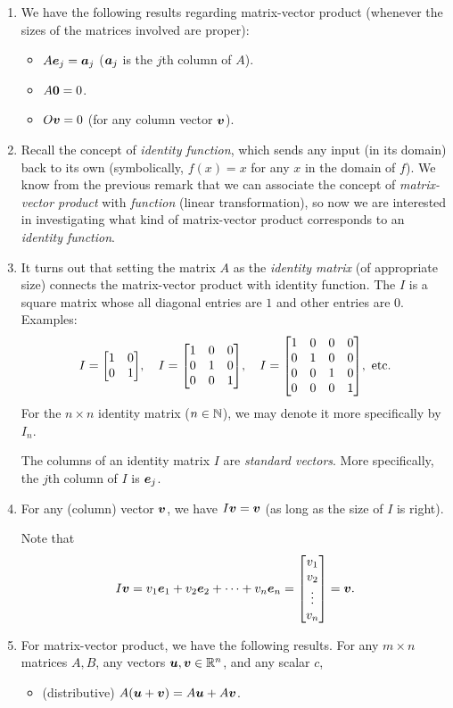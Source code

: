 \begin{enumerate}
\item We have the following results regarding matrix-vector product (whenever
the sizes of the matrices involved are proper):
\begin{itemize}
\item \(A\vb*{e}_{j}=\vb*{a}_{j}\) (\(\vb*{a}_{j}\) is the \(j\)th column of \(A\)).
\item \(A\vb*{0}=0\).
\item \(O\vb*{v}=0\) (for any column vector \(\vb*{v}\)).
\end{itemize}

\item Recall the concept of \emph{identity function}, which sends any input (in
its domain) back to its own (symbolically, \(f(x)=x\) for any \(x\) in the
domain of \(f\)). We know from the previous remark that we can associate the
concept of \emph{matrix-vector product} with \emph{function} (linear
transformation), so now we are interested in investigating what kind of
matrix-vector product corresponds to an \emph{identity function}.

\item It turns out that setting the matrix \(A\) as the \emph{identity matrix}
(of appropriate size) connects the matrix-vector product with identity
function. The  \(I\) is a square matrix whose all diagonal
entries are \(1\) and other entries are \(0\). Examples:
\[
I=\mqty[\dmat[0]{1,1}],\quad
I=\mqty[\dmat[0]{1,1,1}],\quad
I=\mqty[\dmat[0]{1,1,1,1}],\text{ etc.}
\]
For the \(n\times n\) identity matrix (\(n\in\mathbb{N}\)), we may denote it more
specifically by \(I_{n}\).

\begin{note}
The columns of an identity matrix \(I\) are \emph{standard vectors}. More
specifically, the \(j\)th column of \(I\) is \(\vb*{e}_{j}\).
\end{note}
\item \label{it:identity-matrix-vec-mult}
For any (column) vector \(\vb*{v}\), we have \(I\vb*{v}=\vb*{v}\) (as
long as the size of \(I\) is right).

\begin{pf}
Note that
\[
I\vect{v}=v_{1}\vect{e}_{1}+v_2\vect{e}_{2}+\dotsb+v_{n}\vect{e}_{n}
=\mqty[v_1\\v_2\\\vdots\\v_n]=\vect{v}.
\]
\end{pf}
\item \label{it:matrix-vec-dist-asso}
For matrix-vector product, we have the following results.  For any
\(m\times n\) matrices \(A,B\), any vectors \(\vb*{u},\vb*{v}\in\mathbb{R}^n\), and
any scalar \(c\),
\begin{itemize}
\item (distributive) \(A(\vb*{u}+\vb*{v})=A\vb*{u}+A\vb*{v}\).


\end{itemize}
\end{enumerate}
